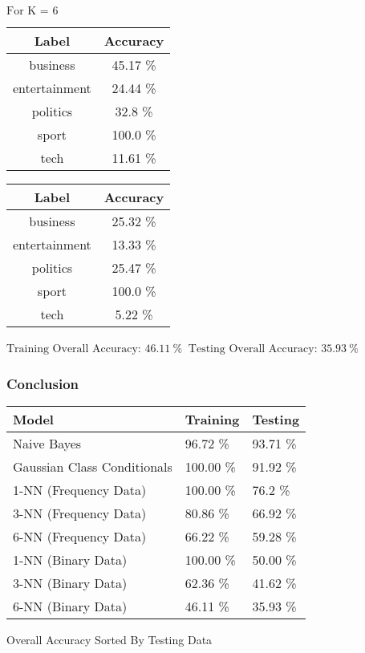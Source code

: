 \documentclass[8pt]{extarticle}
\begin{document}
    $\displaystyle \text{For K = }6$
    \begin{center}
        \quad
    \end{center}
    \begin{center}
        \begin{tabular}{cc}
            \hline
            Label & Accuracy\\
            \hline
            business &   45.17 \% \\
       entertainment &   24.44 \% \\
           politics  &   32.8 \% \\
              sport  &   100.0 \% \\
               tech  &   11.61 \%
         \end{tabular}
         \quad
        \begin{tabular}{cc}
            \hline
            Label & Accuracy\\
            \hline
            business &   25.32 \% \\
        entertainment &  13.33 \% \\
           politics  &   25.47 \% \\
              sport  &   100.0  \% \\
               tech  &   5.22 \%
        \end{tabular}
    \end{center}
    \begin{center}
        $\displaystyle \text{Training Overall Accuracy:\ }46.11\ \%$
        $\displaystyle \ \text{Testing Overall Accuracy:\ }35.93\ \%$
    \end{center}
    \hypertarget{conclusion}{%
\subsubsection{Conclusion}\label{conclusion}}

\begin{center}
    \begin{longtable}[]{@{}lll@{}}
        \toprule
        Model & Training & Testing\tabularnewline
        \midrule
        \endhead
        Naive Bayes & 96.72 \% & 93.71 \%\tabularnewline
        Gaussian Class Conditionals & 100.00 \% & 91.92 \%\tabularnewline
        1-NN (Frequency Data) & 100.00 \% & 76.2 \%\tabularnewline
        3-NN (Frequency Data) & 80.86 \% & 66.92 \%\tabularnewline
        6-NN (Frequency Data) & 66.22 \% & 59.28 \%\tabularnewline
        1-NN (Binary Data) & 100.00 \% & 50.00 \%\tabularnewline
        3-NN (Binary Data) & 62.36 \% & 41.62 \%\tabularnewline
        6-NN (Binary Data) & 46.11 \% & 35.93 \%\tabularnewline
        \bottomrule
    \end{longtable}
    Overall Accuracy Sorted By Testing Data
\end{center}
\end{document}
